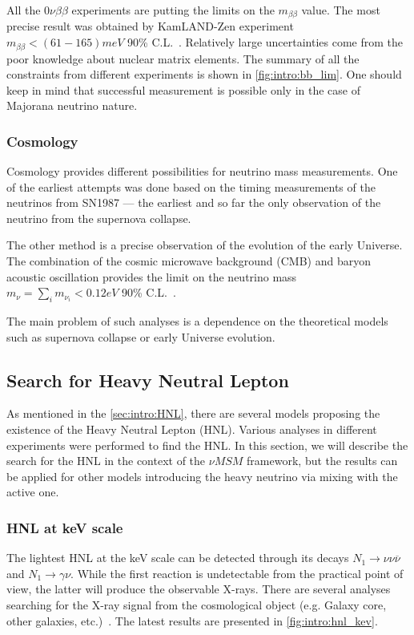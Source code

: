 \documentclass[../main.tex]{subfiles}
\begin{document}
All the $0\nu\beta\beta$ experiments are putting the limits on the $m_{\beta\beta}$ value. The most precise result was obtained by KamLAND-Zen experiment $m_{\beta\beta} < (61-165) meV$ 90\% C.L.~\cite{Gando2016}. Relatively large uncertainties come from the poor knowledge about nuclear matrix elements. The summary of all the constraints from different experiments is shown in \autoref{fig:intro:bb_lim}. One should keep in mind that successful measurement is possible only in the case of Majorana neutrino nature.

\subsubsection{Cosmology}
Cosmology provides different possibilities for neutrino mass measurements. One of the earliest attempts was done based on the timing measurements of the neutrinos from SN1987 --- the earliest and so far the only observation of the neutrino from the supernova collapse.

The other method is a precise observation of the evolution of the early Universe. The combination of the cosmic microwave background (CMB) and baryon acoustic oscillation provides the limit on the neutrino mass $m_\nu=\sum_i m_{\nu_i}<0.12eV$ 90\% C.L.~\cite{Palanque-Delabrouille2015}.

The main problem of such analyses is a dependence on the theoretical models such as supernova collapse or early Universe evolution.

\subsection{Search for Heavy Neutral Lepton}
\label{sec:intro:HNL_exp}
As mentioned in the \autoref{sec:intro:HNL}, there are several models proposing the existence of the Heavy Neutral Lepton (HNL). Various analyses in different experiments were performed to find the HNL. In this section, we will describe the search for the HNL in the context of the $\nu MSM$ framework, but the results can be applied for other models introducing the heavy neutrino via mixing with the active one.

\subsubsection{HNL at keV scale}
The lightest HNL at the keV scale can be detected through its decays $N_1\to \nu\nu\overline{\nu}$ and $N_1\to\gamma\nu$. While the first reaction is undetectable from the practical point of view, the latter will produce the observable X-rays. There are several analyses searching for the X-ray signal from the cosmological object (e.g. Galaxy core, other galaxies, etc.)~\cite{Ng2019, Perez2017}. The latest results are presented in \autoref{fig:intro:hnl_kev}.
\end{document}
